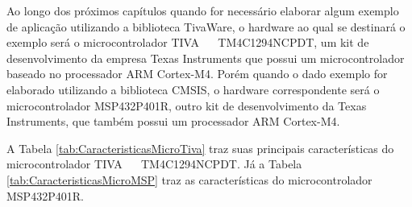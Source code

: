 Ao longo dos próximos capítulos quando for necessário elaborar algum exemplo de aplicação utilizando a biblioteca TivaWare, o hardware ao qual se destinará o exemplo será o microcontrolador  TIVA \texttrademark ~~ TM4C1294NCPDT, um kit de desenvolvimento da empresa Texas Instruments que possui um microcontrolador baseado no processador ARM Cortex-M4. Porém quando o dado exemplo for elaborado utilizando a biblioteca CMSIS, o hardware correspondente será o microcontrolador MSP432P401R\texttrademark, outro kit de desenvolvimento da Texas Instruments, que também possui um processador ARM Cortex-M4.  

A Tabela \ref{tab:CaracteristicasMicroTiva} traz suas principais características do microcontrolador TIVA \texttrademark ~~ TM4C1294NCPDT. Já a Tabela \ref{tab:CaracteristicasMicroMSP} traz as características do microcontrolador MSP432P401R\texttrademark.


